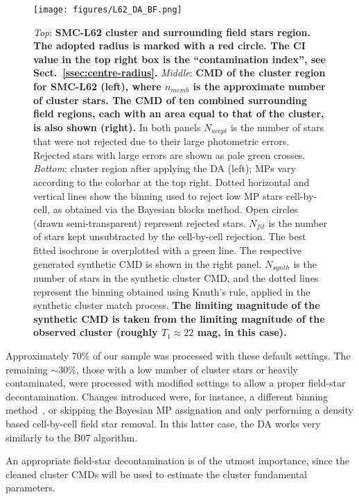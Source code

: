 \documentclass[referee]{aa}
\begin{document}
\begin{figure}
\centering
\texttt{[image: figures/L62\_DA\_BF.png]}
\caption{\emph{Top}: \textbf{SMC-L62 cluster and surrounding field stars
region. The adopted radius is marked with a red circle. The CI value in the top
right box is the ``contamination index'', see Sect.~\ref{ssec:centre-radius}.}
%
\emph{Middle}: \textbf{CMD of the cluster region for SMC-L62 (left),
where $n_{memb}$ is the approximate number of cluster stars. The CMD
of \textbf{ten combined surrounding field regions, each with an area equal to
that of the cluster,} is also shown (right).}
In both panels $N_{accpt}$ is the number of stars that were not rejected due to
their large photometric errors. Rejected stars with large errors are shown as
pale green crosses.
%
\emph{Bottom}: cluster region after applying the DA (left); MPs vary
according to the colorbar at the top right. Dotted horizontal and vertical lines
show the binning used to reject low MP stars cell-by-cell, as obtained via the
Bayesian blocks method. Open circles (drawn semi-transparent) represent rejected
stars.
$N_{fit}$ is the number of stars kept unsubtracted by the cell-by-cell
rejection. The best fitted isochrone is overplotted with a green line. 
The respective generated synthetic CMD is shown in the right panel. $N_{synth}$
is the number of stars in the synthetic cluster CMD, and the dotted lines
represent the binning obtained using Knuth's rule, applied in the synthetic
cluster match process. \textbf{The limiting magnitude of the synthetic CMD is
taken from the limiting magnitude of the observed cluster (roughly
$T_1{\approx}22$ mag, in this case).}}
\label{fig:DA_BF}
\end{figure}

Approximately 70\% of our sample was processed with these default settings.
%
The remaining ${\sim}$30\%, those with a low number of cluster stars
or heavily contaminated, were processed with modified settings to allow a proper
field-star decontamination.
Changes introduced were, for instance, a different binning
method~\citep[often a rectangular grid using Scott's rule,][]{Scott_1979},
or skipping the Bayesian MP assignation and only performing a density based
cell-by-cell field star removal. In this latter case, the DA works very
similarly to the B07 algorithm.

An appropriate field-star decontamination is of the utmost importance, since the
cleaned cluster CMDs will be used to estimate the cluster fundamental parameters.
\end{document}
